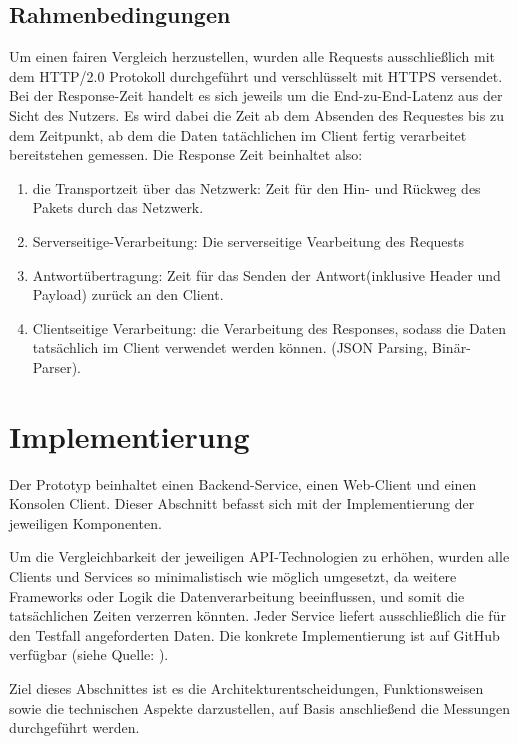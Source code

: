 \subsection*{Rahmenbedingungen}
Um einen fairen Vergleich herzustellen, wurden alle Requests ausschließlich mit dem HTTP/2.0 Protokoll durchgeführt und verschlüsselt mit HTTPS versendet. Bei der Response-Zeit handelt es sich jeweils um die End-zu-End-Latenz aus der Sicht des Nutzers. Es wird dabei die Zeit ab dem Absenden des Requestes bis zu dem Zeitpunkt, ab dem die Daten tatächlichen im Client fertig verarbeitet bereitstehen gemessen. Die Response Zeit beinhaltet also: 

\begin{enumerate}
	\item die Transportzeit über das Netzwerk:
	Zeit für den Hin- und Rückweg des Pakets durch das Netzwerk.
	
	\item Serverseitige-Verarbeitung:
	Die serverseitige Vearbeitung des Requests
	
	\item Antwortübertragung:
	Zeit für das Senden der Antwort(inklusive Header und Payload) zurück an den Client.
	
	\item Clientseitige Verarbeitung:
	die Verarbeitung des Responses, sodass die Daten tatsächlich im Client verwendet werden können. (JSON Parsing, Binär-Parser).
	
\end{enumerate}

\clearpage
\section{Implementierung}
Der Prototyp beinhaltet einen Backend-Service, einen Web-Client und einen Konsolen Client. Dieser Abschnitt befasst sich mit der Implementierung der jeweiligen Komponenten. 

Um die Vergleichbarkeit der jeweiligen API-Technologien zu erhöhen, wurden alle Clients und Services so minimalistisch wie möglich umgesetzt, da weitere Frameworks oder Logik die Datenverarbeitung beeinflussen, und somit die tatsächlichen Zeiten verzerren könnten.
Jeder Service liefert ausschließlich die für den Testfall angeforderten Daten. 
Die konkrete Implementierung ist auf GitHub verfügbar (siehe Quelle: \cite{muehlberger2025}).


Ziel dieses Abschnittes ist es die Architekturentscheidungen, Funktionsweisen sowie die technischen Aspekte darzustellen, auf Basis anschließend die Messungen durchgeführt werden.

